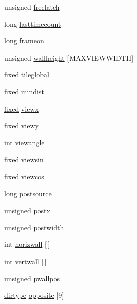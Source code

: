 \begin{DoxyCompactItemize}
unsigned \hyperlink{WL__DEF_8H_a98fdbc277691b144bd2fcbceec9047f9}{freelatch}
\item 
long \hyperlink{WL__DEF_8H_a9833356b947444f0974c777f47e6ce42}{lasttimecount}
\item 
long \hyperlink{WL__DEF_8H_ab2f38827113d9825faddb387c5e3994d}{frameon}
\item 
unsigned \hyperlink{WL__DEF_8H_a9bae25635a51ae6d6ed9884e6cb79559}{wallheight} \mbox{[}MAXVIEWWIDTH\mbox{]}
\item 
\hyperlink{WL__DEF_8H_aaf54715c9b83afe8794059fcf5fd5e7e}{fixed} \hyperlink{WL__DEF_8H_ab864b51e17df4138d9cb8e5549825c3f}{tileglobal}
\item 
\hyperlink{WL__DEF_8H_aaf54715c9b83afe8794059fcf5fd5e7e}{fixed} \hyperlink{WL__DEF_8H_addd9ebc9c7527dc7aec9cb48e3c1f796}{mindist}
\item 
\hyperlink{WL__DEF_8H_aaf54715c9b83afe8794059fcf5fd5e7e}{fixed} \hyperlink{WL__DEF_8H_afb516c78f435a37fab0a0a7b975ff4d9}{viewx}
\item 
\hyperlink{WL__DEF_8H_aaf54715c9b83afe8794059fcf5fd5e7e}{fixed} \hyperlink{WL__DEF_8H_a0ebb891d97bc41244012d2b8d7458f22}{viewy}
\item 
int \hyperlink{WL__DEF_8H_a3018b2f6c2d45eb33e8c894301d545df}{viewangle}
\item 
\hyperlink{WL__DEF_8H_aaf54715c9b83afe8794059fcf5fd5e7e}{fixed} \hyperlink{WL__DEF_8H_a6ca4a83bcb83e06a95d69a43ab77887e}{viewsin}
\item 
\hyperlink{WL__DEF_8H_aaf54715c9b83afe8794059fcf5fd5e7e}{fixed} \hyperlink{WL__DEF_8H_a0e86106be09185a6081d7d46b004a303}{viewcos}
\item 
long \hyperlink{WL__DEF_8H_a5c3da61f4f3a18106264fea7208c84cd}{postsource}
\item 
unsigned \hyperlink{WL__DEF_8H_a04274d2d5024d95f76a7c66cc176f0e2}{postx}
\item 
unsigned \hyperlink{WL__DEF_8H_a9cdf6d376906876ee5303bf1c419c053}{postwidth}
\item 
int \hyperlink{WL__DEF_8H_a9e76de2df586ec3092f08a6875bf62f1}{horizwall} \mbox{[}$\,$\mbox{]}
\item 
int \hyperlink{WL__DEF_8H_a33dd68cfdf1b7c0ac8d46057e74d90a2}{vertwall} \mbox{[}$\,$\mbox{]}
\item 
unsigned \hyperlink{WL__DEF_8H_a02920979fad1fa03663ac63efaabc2a5}{pwallpos}
\item 
\hyperlink{WL__DEF_8H_a04ddebf7fd2f3611173b2d219f4ec05f}{dirtype} \hyperlink{WL__DEF_8H_a3787e913f047b454249a44046f17639d}{opposite} \mbox{[}9\mbox{]}

\end{DoxyCompactItemize}
